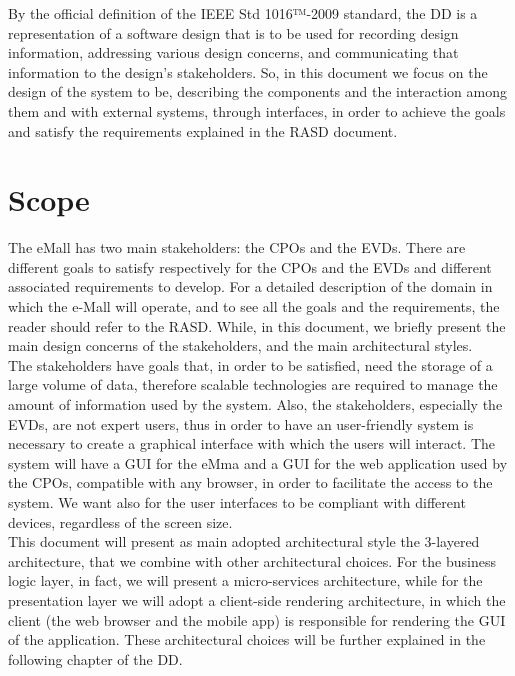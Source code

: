 By the official definition of the IEEE Std 1016™-2009 standard, the DD is a representation of a software design that is to be used for recording design information, addressing various design concerns, and communicating that information to the design’s stakeholders. So, in this document we focus on the design of the system to be, describing the components and the interaction among them and with external systems, through interfaces, in order to achieve the goals and satisfy the requirements explained in the RASD document. 

\section{Scope}
\label{sec:Scope}%
The eMall has two main stakeholders: the CPOs and the EVDs. There are different goals to satisfy respectively for the CPOs and the EVDs and different associated requirements to develop. For a detailed description of the domain in which the e-Mall will operate, and to see all the goals and the requirements, the reader should refer to the RASD. While, in this document, we briefly present the main design concerns of the stakeholders, and the main architectural styles. \\

The stakeholders have goals that, in order to be satisfied, need the storage of a large volume of data, therefore scalable technologies are required to manage the amount of information used by the system.
Also, the stakeholders, especially the EVDs, are not expert users, thus in order to have an user-friendly system is necessary to create a graphical interface with which the users will interact. The system will have a GUI for the eMma and a GUI for the web application used by the CPOs, compatible with any browser, in order to facilitate the access to the system. We want also for the user interfaces to be compliant with different devices, regardless of the screen size.\\

This document will present as main adopted architectural style the 3-layered architecture, that we combine with other architectural choices. For the business logic layer, in fact, we will present a micro-services architecture, while for the presentation layer we will adopt a client-side rendering architecture, in which the client (the web browser and the mobile app) is responsible for rendering the GUI of the application. These architectural choices will be further explained in the following chapter of the DD.

